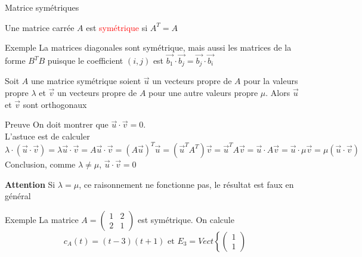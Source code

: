         \begin{parag}{Matrice symétriques}
            \begin{definition}
                Une matrice carrée $A$ est \textcolor{red}{symétrique} si $A^T = A$
            \end{definition}
            \begin{subparag}{Exemple}
                La matrices diagonales sont symétrique, mais aussi les matrices de la forme $B^TB$ puisque le coefficient $(i, j)$ est $\vec{b_1}\cdot\vec{b_j} = \vec{b_j}\cdot \vec{b_i}$
            \end{subparag}
            \begin{theoreme}
                Soit $A$ une matrice symétrique soient $\vec{u}$ un vecteurs propre de $A$ pour la valeurs propre $\lambda$ et $\vec{v}$ un vecteurs propre de $A$ pour une autre valeurs propre $\mu$. Alors $\vec{u}$ et $\vec{v}$ sont orthogonaux
            \end{theoreme}
            \begin{subparag}{Preuve}
                On doit montrer que $\vec{u}\cdot \vec{v} = 0$.
                \\
                L'astuce est de calculer $\lambda\cdot(\vec{u}\cdot\vec{v}) = \lambda \vec{u}\cdot\vec{v} = A\vec{u}\cdot\vec{v} = (A\vec{u})^T\vec{u} = (\vec{u}^TA^T)\vec{v} = \vec{u}^TA\vec{v} = \vec{u}\cdot A\vec{v} = \vec{u}\cdot\mu\vec{v} = \mu(\vec{u}\cdot\vec{v})$ 
                \\
                Conclusion, comme $\lambda \neq \mu$, $\vec{u}\cdot\vec{v} = 0$
                \\
                \begin{framedremark}
                    \textbf{Attention}
                Si $\lambda = \mu$, ce raisonnement ne fonctionne pas, le résultat est faux en général
                \end{framedremark}
            \end{subparag}
            \begin{subparag}{Exemple}
                La matrice $A = \begin{pmatrix}
                    1 & 2\\
                    2 & 1
                \end{pmatrix}$ est symétrique. On calcule
                \[c_A(t) = (t-3)(t+1) \text{ et } E_3 = Vect\left\{\begin{pmatrix}
                    1 \\ 1

\end{pmatrix}\]
\end{subparag}
\end{parag}
